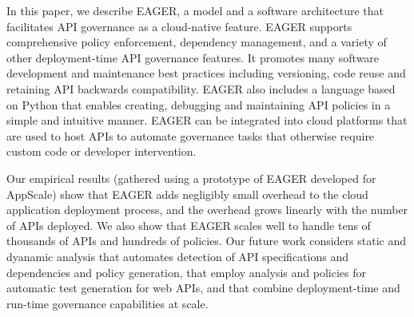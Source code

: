 In this paper, we describe EAGER, a model and a software architecture that 
facilitates API governance as a cloud-native feature. EAGER supports comprehensive policy
enforcement, dependency management, and a variety of other deployment-time API
governance features. It promotes many software development and maintenance
best practices including versioning, code reuse and retaining API backwards
compatibility. EAGER also includes a language based on Python that enables
creating, debugging and maintaining API policies in a simple and intuitive
manner. EAGER can be integrated into cloud platforms that are used to host APIs
to automate governance tasks that otherwise require custom code or developer intervention.

Our empirical results (gathered using a prototype of EAGER developed for AppScale)
show that EAGER adds negligibly small overhead to the cloud application 
deployment process, and the overhead grows linearly
with the number of APIs deployed. We also show that EAGER scales well 
to handle tens of thousands of APIs and hundreds of policies. 
Our future work considers static and dyanamic analysis
that automates detection of API specifications and dependencies and 
policy generation, that employ 
analysis and policies for automatic test generation for web APIs, and that 
combine deployment-time and run-time governance capabilities at scale.
